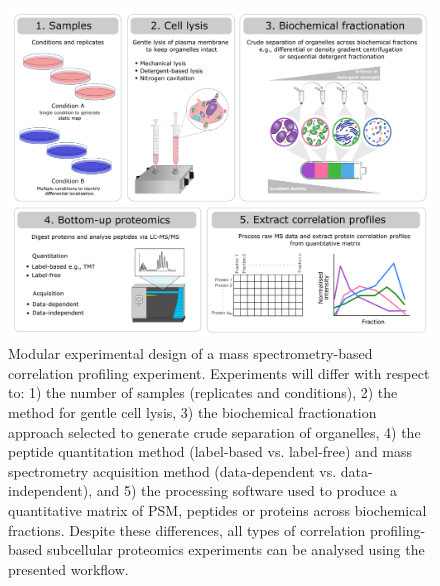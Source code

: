 \documentclass[9pt,a4paper,]{extarticle}
\begin{document}
\begin{figure}[H]

{\centering \includegraphics[width=0.9\linewidth,]{figs/pcp_steps} 

}

\caption{Modular experimental design of a mass spectrometry-based correlation profiling experiment. Experiments will differ with respect to: 1) the number of samples (replicates and conditions), 2) the method for gentle cell lysis, 3) the biochemical fractionation approach selected to generate crude separation of organelles, 4) the peptide quantitation method (label-based vs. label-free) and mass spectrometry acquisition method (data-dependent vs. data-independent), and 5) the processing software used to produce a quantitative matrix of PSM, peptides or proteins across biochemical fractions. Despite these differences, all types of correlation profiling-based subcellular proteomics experiments can be analysed using the presented workflow.}\label{fig:pcp-picture}
\end{figure}
\end{document}
